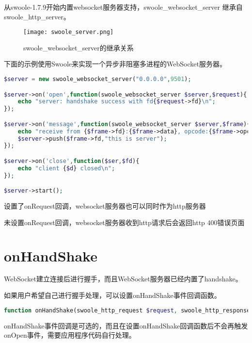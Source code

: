 从swoole-1.7.9开始内置websocket服务器支持，swoole\_websocket\_server 继承自 swoole\_http\_server。

\begin{figure}[htbp]
\centering
\texttt{[image: swoole\_server.png]}
\caption{swoole\_websocket\_server的继承关系}
\end{figure}



下面的示例使用Swoole来实现一个异步非阻塞多进程的WebSocket服务器。

\begin{lstlisting}[language=PHP]
$server = new swoole_websocket_server("0.0.0.0",9501);

$server->on('open',function(swoole_websocket_server $server,$request){
	echo "server: handshake success with fd{$request->fd}\n";
});

$server->on('message',function(swoole_websocket_server $server,$frame){
	echo "receive from {$frame->fd}:{$frame->data}, opcode:{$frame->opcode},fin:{$frame->finish}\n"
	$server->push($frame->fd,"this is server");
});

$server->on('close',function($ser,$fd){
	echo "client {$d} closed\n";
});

$server->start();
\end{lstlisting}

\begin{compactitem}
\item 设置了onRequest回调，websocket服务器也可以同时作为http服务器
\item 未设置onRequest回调，websocket服务器收到http请求后会返回http 400错误页面
\end{compactitem}

\section{onHandShake}

WebSocket建立连接后进行握手，而且WebSocket服务器已经内置了handshake。

如果用户希望自己进行握手处理，可以设置onHandShake事件回调函数。





\begin{lstlisting}[language=PHP]
function onHandShake(swoole_http_request $request, swoole_http_response $response)
\end{lstlisting}

onHandShake事件回调是可选的，而且在设置onHandShake回调函数后不会再触发onOpen事件，需要应用程序代码自行处理。

